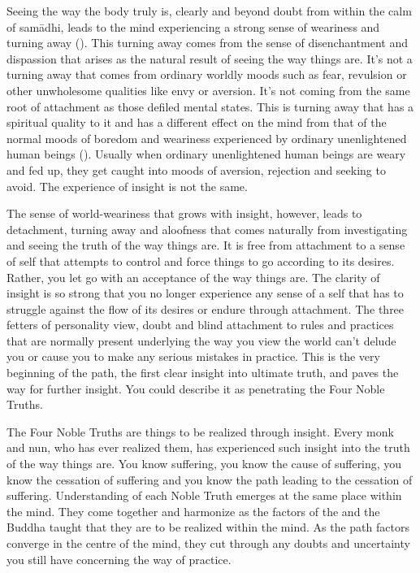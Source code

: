Seeing the way the body truly is, clearly and beyond doubt from within the calm of sam\=adhi, leads to the mind experiencing a strong sense of weariness and turning away (). This turning away comes from the sense of disenchantment and dispassion that arises as the natural result of seeing the way things are. It's not a turning away that comes from ordinary worldly moods such as fear, revulsion or other unwholesome qualities like envy or aversion. It's not coming from the same root of attachment as those defiled mental states. This is turning away that has a spiritual quality to it and has a different effect on the mind from that of the normal moods of boredom and weariness experienced by ordinary unenlightened human beings (). Usually when ordinary unenlightened human beings are weary and fed up, they get caught into moods of aversion, rejection and seeking to avoid. The experience of insight is not the same.

The sense of world-weariness that grows with insight, however, leads to detachment, turning away and aloofness that comes naturally from investigating and seeing the truth of the way things are. It is free from attachment to a sense of self that attempts to control and force things to go according to its desires. Rather, you let go with an acceptance of the way things are. The clarity of insight is so strong that you no longer experience any sense of a self that has to struggle against the flow of its desires or endure through attachment. The three fetters of personality view, doubt and blind attachment to rules and practices that are normally present underlying the way you view the world can't delude you or cause you to make any serious mistakes in practice. This is the very beginning of the path, the first clear insight into ultimate truth, and paves the way for further insight. You could describe it as penetrating the Four Noble Truths.

The Four Noble Truths are things to be realized through insight. Every monk and nun, who has ever realized them, has experienced such insight into the truth of the way things are. You know suffering, you know the cause of suffering, you know the cessation of suffering and you know the path leading to the cessation of suffering. Understanding of each Noble Truth emerges at the same place within the mind. They come together and harmonize as the factors of the  and the Buddha taught that they are to be realized within the mind. As the path factors converge in the centre of the mind, they cut through any doubts and uncertainty you still have concerning the way of practice.

